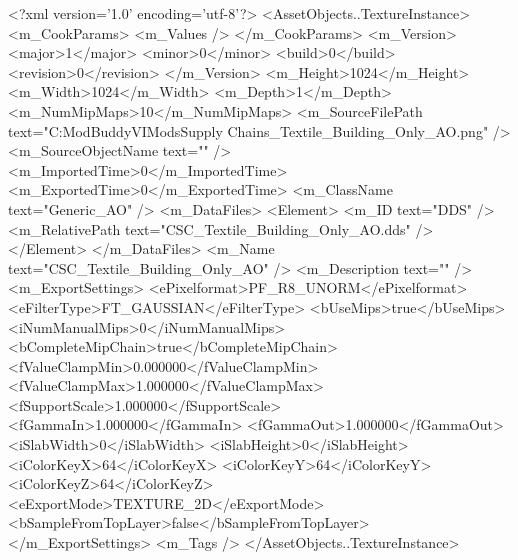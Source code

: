 <?xml version='1.0' encoding='utf-8'?>
<AssetObjects..TextureInstance>
  <m_CookParams>
    <m_Values />
  </m_CookParams>
  <m_Version>
    <major>1</major>
    <minor>0</minor>
    <build>0</build>
    <revision>0</revision>
  </m_Version>
  <m_Height>1024</m_Height>
  <m_Width>1024</m_Width>
  <m_Depth>1</m_Depth>
  <m_NumMipMaps>10</m_NumMipMaps>
  <m_SourceFilePath text="C:\Users\Shadow\Documents\Firaxis ModBuddy\Civilization VI\Henno Mods\Civ Supply Chains\TextureSources\CSC_Textile_Building_Only_AO.png" />
  <m_SourceObjectName text="" />
  <m_ImportedTime>0</m_ImportedTime>
  <m_ExportedTime>0</m_ExportedTime>
  <m_ClassName text="Generic_AO" />
  <m_DataFiles>
    <Element>
      <m_ID text="DDS" />
      <m_RelativePath text="CSC_Textile_Building_Only_AO.dds" />
    </Element>
  </m_DataFiles>
  <m_Name text="CSC_Textile_Building_Only_AO" />
  <m_Description text="" />
  <m_ExportSettings>
    <ePixelformat>PF_R8_UNORM</ePixelformat>
    <eFilterType>FT_GAUSSIAN</eFilterType>
    <bUseMips>true</bUseMips>
    <iNumManualMips>0</iNumManualMips>
    <bCompleteMipChain>true</bCompleteMipChain>
    <fValueClampMin>0.000000</fValueClampMin>
    <fValueClampMax>1.000000</fValueClampMax>
    <fSupportScale>1.000000</fSupportScale>
    <fGammaIn>1.000000</fGammaIn>
    <fGammaOut>1.000000</fGammaOut>
    <iSlabWidth>0</iSlabWidth>
    <iSlabHeight>0</iSlabHeight>
    <iColorKeyX>64</iColorKeyX>
    <iColorKeyY>64</iColorKeyY>
    <iColorKeyZ>64</iColorKeyZ>
    <eExportMode>TEXTURE_2D</eExportMode>
    <bSampleFromTopLayer>false</bSampleFromTopLayer>
  </m_ExportSettings>
  <m_Tags />
</AssetObjects..TextureInstance>
